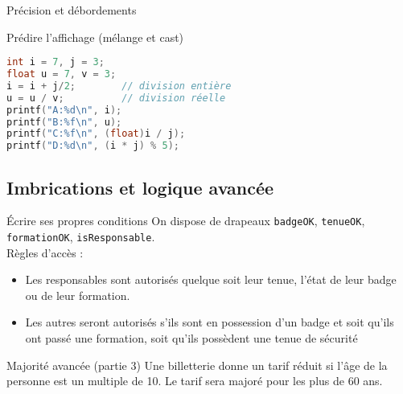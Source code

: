 \begin{UPSTIexercice}{Précision et débordements}
\end{UPSTIexercice}


\begin{UPSTIexercice}{Prédire l'affichage (mélange et cast)}
\begin{lstlisting}[language=C]
int i = 7, j = 3;
float u = 7, v = 3;
i = i + j/2;        // division entière
u = u / v;          // division réelle
printf("A:%d\n", i);
printf("B:%f\n", u);
printf("C:%f\n", (float)i / j);
printf("D:%d\n", (i * j) % 5);
\end{lstlisting}
\end{UPSTIexercice}


\subsection{Imbrications et logique avancée}

\begin{UPSTIexercice}{Écrire ses propres conditions}
    On dispose de drapeaux \verb|badgeOK|, \verb|tenueOK|, \verb|formationOK|, \verb|isResponsable|.\\
    Règles d'accès : 
    \begin{itemize}
        \item Les responsables sont autorisés quelque soit leur tenue, l'état de leur badge ou de leur formation. 
        \item Les autres seront autorisés s'ils sont en possession d'un badge et soit qu'ils ont passé une formation, soit qu'ils possèdent une tenue de sécurité
    \end{itemize}
\end{UPSTIexercice}

\begin{UPSTIexercice}{Majorité avancée (partie 3)}
Une billetterie donne un tarif réduit si l'âge de la personne est un multiple de 10. Le tarif sera majoré pour les plus de 60 ans.
\end{UPSTIexercice}

